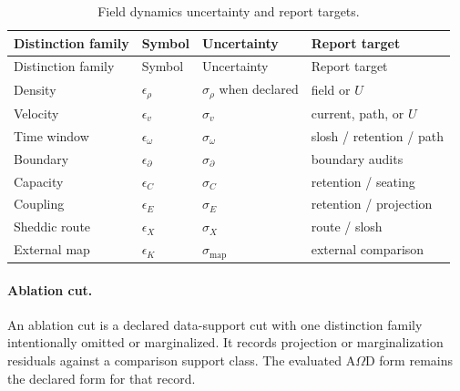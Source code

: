 \begin{longtable}{@{}p{}p{}p{}p{}@{}}
\caption{Field dynamics uncertainty and report targets.}\label{tab:field-dynamics-data-support-budget-b}\\
\toprule
Distinction family & Symbol & Uncertainty & Report target\\
\midrule
\endfirsthead
\toprule
Distinction family & Symbol & Uncertainty & Report target\\
\midrule
\endhead
Density & \(\epsilon_\rho\) & \(\sigma_\rho\) when declared & field or \(U\)\\
Velocity & \(\epsilon_v\) & \(\sigma_v\) & current, path, or \(U\)\\
Time window & \(\epsilon_\omega\) & \(\sigma_\omega\) & slosh / retention / path\\
Boundary & \(\epsilon_{\partial}\) & \(\sigma_{\partial}\) & boundary audits\\
Capacity & \(\epsilon_C\) & \(\sigma_C\) & retention / seating\\
Coupling & \(\epsilon_E\) & \(\sigma_E\) & retention / projection\\
Sheddic route & \(\epsilon_X\) & \(\sigma_X\) & route / slosh\\
External map & \(\epsilon_K\) & \(\sigma_{\mathrm{map}}\) & external comparison\\
\bottomrule
\end{longtable}
\normalsize


\paragraph{Ablation cut.}
An ablation cut is a declared data-support cut with one distinction family intentionally omitted or marginalized. It records projection or marginalization residuals against a comparison support class. The evaluated A\(\Omega\)D form remains the declared form for that record.

